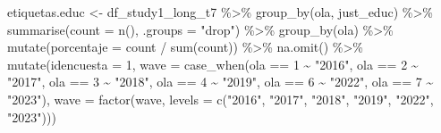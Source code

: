 \documentclass[
  12pt,
  letterpaper,
  DIV=11,
  numbers=noendperiod]{scrartcl}
\newenvironment{Shaded}{\begin{snugshade}}{\end{snugshade}}
\newcommand{\AttributeTok}[1]{\textcolor[rgb]{0.40,0.45,0.13}{#1}}
\newcommand{\DecValTok}[1]{\textcolor[rgb]{0.68,0.00,0.00}{#1}}
\newcommand{\FunctionTok}[1]{\textcolor[rgb]{0.28,0.35,0.67}{#1}}
\newcommand{\NormalTok}[1]{\textcolor[rgb]{0.00,0.23,0.31}{#1}}
\newcommand{\OtherTok}[1]{\textcolor[rgb]{0.00,0.23,0.31}{#1}}
\newcommand{\SpecialCharTok}[1]{\textcolor[rgb]{0.37,0.37,0.37}{#1}}
\newcommand{\StringTok}[1]{\textcolor[rgb]{0.13,0.47,0.30}{#1}}
\begin{document}
\begin{Shaded}
\begin{Highlighting}[]
\NormalTok{etiquetas.educ }\OtherTok{\textless{}{-}}\NormalTok{ df\_study1\_long\_t7 }\SpecialCharTok{\%\textgreater{}\%}
  \FunctionTok{group\_by}\NormalTok{(ola, just\_educ) }\SpecialCharTok{\%\textgreater{}\%}
  \FunctionTok{summarise}\NormalTok{(}\AttributeTok{count =} \FunctionTok{n}\NormalTok{(), }\AttributeTok{.groups =} \StringTok{"drop"}\NormalTok{) }\SpecialCharTok{\%\textgreater{}\%}
  \FunctionTok{group\_by}\NormalTok{(ola) }\SpecialCharTok{\%\textgreater{}\%}
  \FunctionTok{mutate}\NormalTok{(}\AttributeTok{porcentaje =}\NormalTok{ count }\SpecialCharTok{/} \FunctionTok{sum}\NormalTok{(count)) }\SpecialCharTok{\%\textgreater{}\%} 
  \FunctionTok{na.omit}\NormalTok{() }\SpecialCharTok{\%\textgreater{}\%} 
  \FunctionTok{mutate}\NormalTok{(}\AttributeTok{idencuesta =} \DecValTok{1}\NormalTok{,}
         \AttributeTok{wave =} \FunctionTok{case\_when}\NormalTok{(ola }\SpecialCharTok{==} \DecValTok{1} \SpecialCharTok{\textasciitilde{}} \StringTok{"2016"}\NormalTok{,}
\NormalTok{                          ola }\SpecialCharTok{==} \DecValTok{2} \SpecialCharTok{\textasciitilde{}} \StringTok{"2017"}\NormalTok{,}
\NormalTok{                          ola }\SpecialCharTok{==} \DecValTok{3} \SpecialCharTok{\textasciitilde{}} \StringTok{"2018"}\NormalTok{,}
\NormalTok{                          ola }\SpecialCharTok{==} \DecValTok{4} \SpecialCharTok{\textasciitilde{}} \StringTok{"2019"}\NormalTok{,}
\NormalTok{                          ola }\SpecialCharTok{==} \DecValTok{6} \SpecialCharTok{\textasciitilde{}} \StringTok{"2022"}\NormalTok{,}
\NormalTok{                          ola }\SpecialCharTok{==} \DecValTok{7} \SpecialCharTok{\textasciitilde{}} \StringTok{"2023"}\NormalTok{),}
         \AttributeTok{wave =} \FunctionTok{factor}\NormalTok{(wave, }\AttributeTok{levels =} \FunctionTok{c}\NormalTok{(}\StringTok{"2016"}\NormalTok{,}
                                        \StringTok{"2017"}\NormalTok{,}
                                        \StringTok{"2018"}\NormalTok{,}
                                        \StringTok{"2019"}\NormalTok{,}
                                        \StringTok{"2022"}\NormalTok{,}
                                        \StringTok{"2023"}\NormalTok{)))}


\end{Highlighting}
\end{Shaded}
\end{document}
